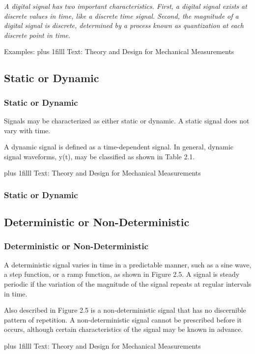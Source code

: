 \documentclass[fleqn]{beamer} %
\newcommand{\sectionIsubsectionIIItitle}{Static or Dynamic}
\newcommand{\sectionIsubsectionIVtitle}{Deterministic or Non-Deterministic}
\newcommand{\btVFill}{\vskip0pt plus 1filll}
\begin{document}
			\begin{frame}
			\bigskip 
			{\it A {\BL digital} signal has two important characteristics. First, a digital signal
			exists at discrete values in time, like a discrete time signal. Second, the magnitude of a digital signal
			is discrete, determined by a process known as {\PR quantization} at each discrete point in time. }

		\vspace{30mm}
		Examples:
		\btVFill
		\tiny{Text: Theory and Design for Mechanical Measurements}	
			\end{frame}





		\subsection{\sectionIsubsectionIIItitle}\label{sectionIsubsectionIII}
			\begin{frame} 
				\frametitle{\sectionIsubsectionIIItitle}

				\bigskip

Signals may be characterized as either static or
dynamic. A static signal does not vary with time.

A dynamic signal is defined as a time-dependent signal. In general, dynamic signal waveforms,
y(t), may be classified as shown in Table 2.1.
	
\btVFill
\tiny{Text: Theory and Design for Mechanical Measurements}	



			\end{frame}	

			\begin{frame} 
				\frametitle{\sectionIsubsectionIIItitle}

				
			\end{frame}	

		\subsection{\sectionIsubsectionIVtitle}\label{sectionIsubsectionIV}	

			\begin{frame}
				\frametitle{\sectionIsubsectionIVtitle}

				\bigskip

A deterministic signal varies in time in a predictable
manner, such as a sine wave, a step function, or a ramp function, as shown in Figure 2.5. A signal is
steady periodic if the variation of the magnitude of the signal repeats at regular intervals in time.

Also described in Figure 2.5 is a non-deterministic signal that has no discernible pattern of
repetition. A non-deterministic signal cannot be prescribed before it occurs, although certain characteristics of the signal may be known in advance.

\btVFill
\tiny{Text: Theory and Design for Mechanical Measurements}
		
				
			\end{frame}
\end{document}
